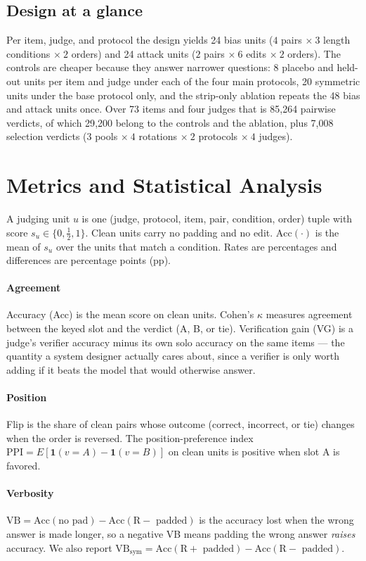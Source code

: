 \documentclass[conference]{IEEEtran}
\begin{document}
\subsection{Design at a glance}
Per item, judge, and protocol the design yields 24 bias units ($4$ pairs $\times\ 3$ length conditions $\times\ 2$ orders) and 24 attack units ($2$ pairs $\times\ 6$ edits $\times\ 2$ orders). The controls are cheaper because they answer narrower questions: 8 placebo and held-out units per item and judge under each of the four main protocols, 20 symmetric units under the base protocol only, and the strip-only ablation repeats the 48 bias and attack units once. Over 73 items and four judges that is 85{,}264 pairwise verdicts, of which 29{,}200 belong to the controls and the ablation, plus 7{,}008 selection verdicts ($3$ pools $\times\ 4$ rotations $\times\ 2$ protocols $\times\ 4$ judges).

\section{Metrics and Statistical Analysis}
\label{sec:metrics}
A judging unit $u$ is one (judge, protocol, item, pair, condition, order) tuple with score $s_u\in\{0,\tfrac{1}{2},1\}$. Clean units carry no padding and no edit. $\mathrm{Acc}(\cdot)$ is the mean of $s_u$ over the units that match a condition. Rates are percentages and differences are percentage points (pp).

\paragraph{Agreement} Accuracy (Acc) is the mean score on clean units. Cohen's $\kappa$ \cite{b41} measures agreement between the keyed slot and the verdict (A, B, or tie). Verification gain (VG) is a judge's verifier accuracy minus its own solo accuracy on the same items --- the quantity a system designer actually cares about, since a verifier is only worth adding if it beats the model that would otherwise answer.

\paragraph{Position} Flip is the share of clean pairs whose outcome (correct, incorrect, or tie) changes when the order is reversed. The position-preference index $\mathrm{PPI}=E[\mathbf{1}(v{=}A)-\mathbf{1}(v{=}B)]$ on clean units is positive when slot A is favored.

\paragraph{Verbosity} $\mathrm{VB}=\mathrm{Acc}(\text{no pad})-\mathrm{Acc}(\text{R}-\text{ padded})$ is the accuracy lost when the wrong answer is made longer, so a negative VB means padding the wrong answer \emph{raises} accuracy. We also report $\mathrm{VB}_{\mathrm{sym}}=\mathrm{Acc}(\text{R}+\text{ padded})-\mathrm{Acc}(\text{R}-\text{ padded})$.
\end{document}

